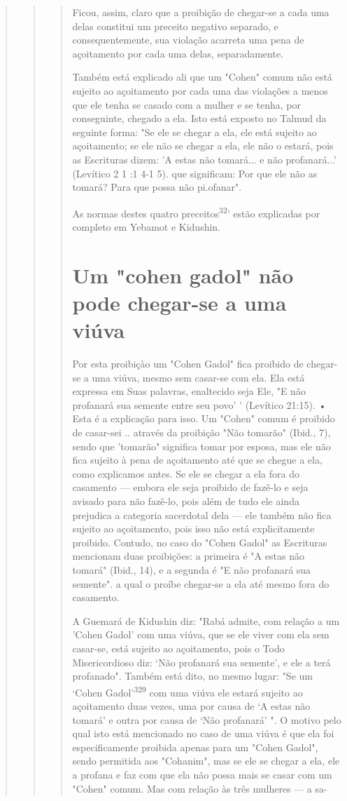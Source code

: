 \begin{quote}
\begin{quote}
\begin{quote}
Ficou, assim, claro que a proibição de chegar-se a cada uma delas
constitui um preceito negativo separado, e consequentemente, sua
violação acar­reta uma pena de açoitamento por cada uma delas,
separadamente.

Também está explicado ali que um "Cohen" comum não está sujei­to ao
açoitamento por cada uma das violações a menos que ele tenha se casado
com a mulher e se tenha, por conseguinte, chegado a ela. Isto está
exposto no Talmud da seguinte forma: "Se ele se chegar a ela, ele está
sujeito ao açoita­mento; se ele não se chegar a ela, ele não o estará,
pois as Escrituras dizem: 'A estas não tomará... e não profanará...'
(Levítico 2 1 :1 4-1 5). que significam: Por que ele não as tomará? Para
que possa não pi.ofanar".

As normas destes quatro preceitos\textsuperscript{32}' estão explicadas
por comple­to em Yebamot e Kidushin.

\section{Um "cohen gadol" não pode chegar-se a uma viúva}

Por esta proibiçào um "Cohen Gadol" fica proibido de chegar-se a uma
viúva, mesmo sem casar-se com ela. Ela está expressa em Suas palavras,
enal­tecido seja Ele, "E não profanará sua semente entre seu povo' '
(Levítico 21:15). • Esta é a explicação para isso. Um "Cohen" comum é
proibido de casar-sei .. através da proibição "Não
tomarão" (Ibid., 7), sendo que 'tomarão" sig­nifica tomar por esposa,
mas ele não fica sujeito à pena de açoitamento até que se chegue a ela,
como explicamos antes. Se ele se chegar a ela fora do casamento ---
embora ele seja proibido de fazê-lo e seja avisado para não fazê-lo,
pois além de tudo ele ainda prejudica a categoria sacerdotal dela ---
ele também não fica sujeito ao açoitamento, pois isso não está
explicitamente proibido. Contudo, no caso do "Cohen Gadol" as Escrituras
mencionam duas proibições: a primei­ra é "A estas não tomará" (Ibid.,
14), e a segunda é "E não profanará sua semen­te". a qual o proíbe
chegar-se a ela até mesmo fora do casamento.

A Guemará de Kidushin diz: "Rabá admite, com relação a um 'Co­hen Gadol'
com uma viúva, que se ele viver com ela sem casar-se, está sujeito ao
açoitamento, pois o Todo Misericordioso diz: `Não profanará sua
semente', e ele a terá profanado". Também está dito, no mesmo lugar: "Se
um `Cohen Gadol'\textsuperscript{329} com uma viúva ele estará sujeito
ao açoitamento duas vezes, uma por causa de `A estas não tomará' e outra
por causa de `Não profanará' ". O motivo pelo qual isto está mencionado
no caso de uma viúva é que ela foi especifica­mente proibida apenas para
um "Cohen Gadol", sendo permitida aos "Coha­nim", mas se ele se chegar a
ela, ele a profana e faz com que ela não possa mais se casar com um
"Cohen" comum. Mas com relação às três mulheres --- a sa-


\end{quote}
\end{quote}
\end{quote}
